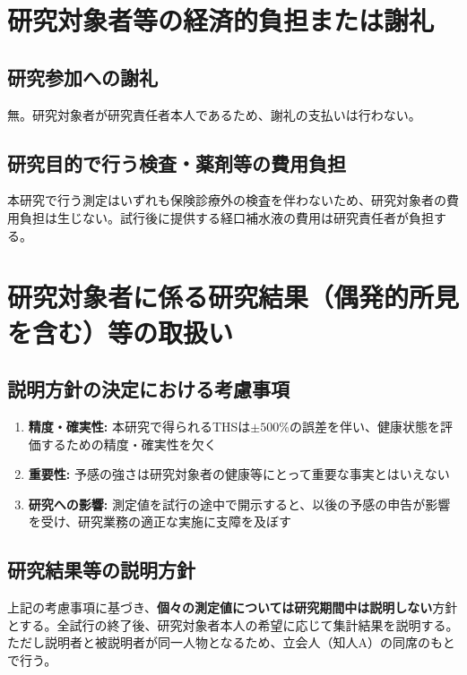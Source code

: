 \documentclass{kyodai-protocol}
\begin{document}
\section{研究対象者等の経済的負担または謝礼}
\label{sec:compensation}

\subsection{研究参加への謝礼}

無。研究対象者が研究責任者本人であるため、謝礼の支払いは行わない。

\subsection{研究目的で行う検査・薬剤等の費用負担}

本研究で行う測定はいずれも保険診療外の検査を伴わないため、研究対象者の費用負担は生じない。試行後に提供する経口補水液の費用は研究責任者が負担する。

\section{研究対象者に係る研究結果（偶発的所見を含む）等の取扱い}
\label{sec:incidental-findings}

\subsection{説明方針の決定における考慮事項}

\begin{enumerate}
\item \textbf{精度・確実性:} 本研究で得られるTHSは$\pm 500$\%の誤差を伴い、健康状態を評価するための精度・確実性を欠く
\item \textbf{重要性:} 予感の強さは研究対象者の健康等にとって重要な事実とはいえない
\item \textbf{研究への影響:} 測定値を試行の途中で開示すると、以後の予感の申告が影響を受け、研究業務の適正な実施に支障を及ぼす
\end{enumerate}

\subsection{研究結果等の説明方針}

上記の考慮事項に基づき、\textbf{個々の測定値については研究期間中は説明しない}方針とする。全試行の終了後、研究対象者本人の希望に応じて集計結果を説明する。ただし説明者と被説明者が同一人物となるため、立会人（知人A）の同席のもとで行う。
\end{document}
